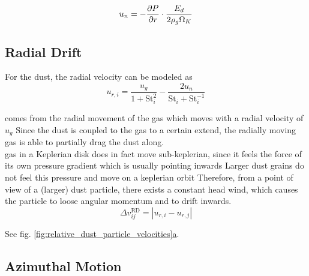    \begin{equation}
        u_{n}
        =-\frac{\partial P}{\partial r}\cdot\frac{E_d}{2\rho_g\Omega_K}
    \end{equation}

    \subsection{Radial Drift}

        For the dust, the radial velocity can be modeled as
        \begin{equation}
            u_{r,i}
            =\frac{u_{g}}{1+\text{St}_i^2}-\frac{2u_{n}}{\text{St}_i+\text{St}_i^{-1}}
        \end{equation}


            comes from the radial movement of the gas 
            which moves with a radial velocity of $u_g$
            Since the dust is coupled to the gas to a certain extend, 
            the radially moving gas is able to partially drag the dust along. \\

             gas in a Keplerian disk does in fact move sub-keplerian, 
             since it feels the force of its own pressure gradient which is usually pointing inwards
             Larger dust grains do not feel this pressure and move on a keplerian orbit
             Therefore, from a point of view of a (larger) dust particle, 
             there exists a constant head wind, 
             which causes the particle to loose angular momentum and to drift inwards. \\

        \begin{equation}
            \Delta v_{ij}^\text{RD}
            =|u_{r,i}-u_{r,j}|
        \end{equation}
    
        See fig.
        \hyperref[fig:relative_dust_particle_velocities]{\ref*{fig:relative_dust_particle_velocities}a}.

    \subsection{Azimuthal Motion}
 
